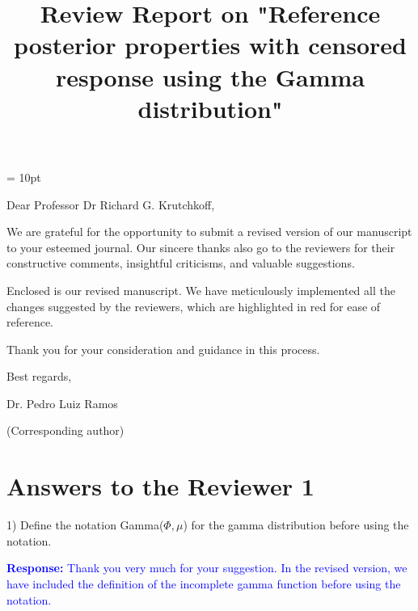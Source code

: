 \documentclass[12pt]{article}
\makeatletter
\newcommand{\singlespacing}{\let\CS=\@currsize\renewcommand{\baselinestretch}{1}\tiny\CS}
\makeatother
\begin{document}
\baselineskip=16pt
\parskip = 10pt
\def \qed {\hfill \vrule height7pt width 5pt depth 0pt}
\setlength\parindent{0pt}
\def\refhg{\hangindent=20pt\hangafter=1}
\def\refmark{\par\vskip 2.50mm\noindent\refhg}
%
%
%
%
%

\def\mathrlap{\mathpalette\mathrlapinternal} 
\def\mathclap{\mathpalette\mathclapinternal}
\def\mathllapinternal#1#2{\llap{$\mathsurround=0pt#1{#2}$}}
\def\mathrlapinternal#1#2{\rlap{$\mathsurround=0pt#1{#2}$}}
\newtheorem{theorem}{Theorem}
\newenvironment{proof}[1][Proof]{\noindent\textbf{#1.} }{\ \rule{0.5em}{0.5em}}


\title{Review Report on
"Reference posterior properties with censored response using the 
Gamma distribution"}
\maketitle

Dear Professor Dr Richard G. Krutchkoff,

We are grateful for the opportunity to submit a revised version of our manuscript to your esteemed journal. Our sincere thanks also go to the reviewers for their constructive comments, insightful criticisms, and valuable suggestions.

Enclosed is our revised manuscript. We have meticulously implemented all the changes suggested by the reviewers, which are highlighted in red for ease of reference.

Thank you for your consideration and guidance in this process.

Best regards,

Dr. Pedro Luiz Ramos

\vspace{-0.3cm}(Corresponding author)

\newpage


\section*{Answers to the Reviewer 1}


1) Define the notation Gamma(\(\Phi, \mu\)) for the gamma distribution before using the notation.

\textcolor{blue}{\textbf{Response:} Thank you very much for your suggestion. In the revised version, we have included the definition of the incomplete gamma function before using the notation.}
\end{document}
